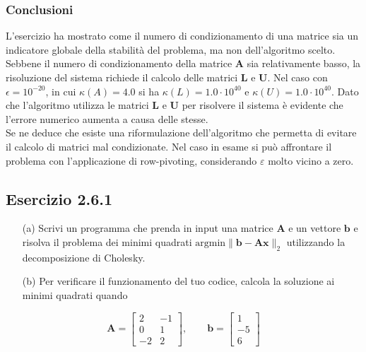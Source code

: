 \documentclass[letterpaper, 12pt]{article}
\numberwithin{equation}{section}    %
\begin{document}
\subsubsection{Conclusioni}
L'esercizio ha mostrato come il numero di condizionamento di una matrice sia un indicatore globale della 
stabilità del problema, ma non dell'algoritmo scelto. Sebbene il numero di condizionamento
della matrice $\mathbf{A}$ sia relativamente basso, la risoluzione del sistema richiede il calcolo delle matrici
$\mathbf{L}$ e $\mathbf{U}$. Nel caso
con $\epsilon = 10^{-20}$, in cui $\kappa(A) =  4.0$ si ha $\kappa(L) = 1.0 \cdot 10^{40}$ e 
$\kappa(U) = 1.0 \cdot 10^{40}$. Dato che l'algoritmo utilizza le matrici $\mathbf{L}$ e $\mathbf{U}$ 
per risolvere il sistema è evidente che l'errore numerico aumenta a causa delle stesse. \\
Se ne deduce che esiste una riformulazione dell'algoritmo che permetta di evitare il calcolo di matrici mal 
condizionate. Nel caso in esame si può affrontare il problema con l'applicazione di row-pivoting, considerando
$\varepsilon$ molto vicino a zero. 

\subsection{Esercizio 2.6.1}
\begin{enumerate}[label=(\alph*)]
    \item[(a)] Scrivi un programma che prenda in input una matrice $\mathbf{A}$ e un vettore $\mathbf{b}$ e risolva 
    il problema dei minimi quadrati $\text{argmin}\| \mathbf{b}- \mathbf{A} \mathbf{x}\|_2$ utilizzando la decomposizione di Cholesky.
    \item[(b)] Per verificare il funzionamento del tuo codice, calcola la soluzione ai minimi quadrati quando
\end{enumerate}
\begin{center}
    \begin{minipage}{0.48\textwidth}
    \centering
    \[
    \mathbf{A} = \begin{bmatrix}
      2 & -1 \\
      0 & 1 \\
      -2 & 2
    \end{bmatrix}, \qquad
    \mathbf{b} = \begin{bmatrix}
      1 \\ -5 \\ 6
    \end{bmatrix}
    \]
    \end{minipage}
\end{center}
\end{document}
